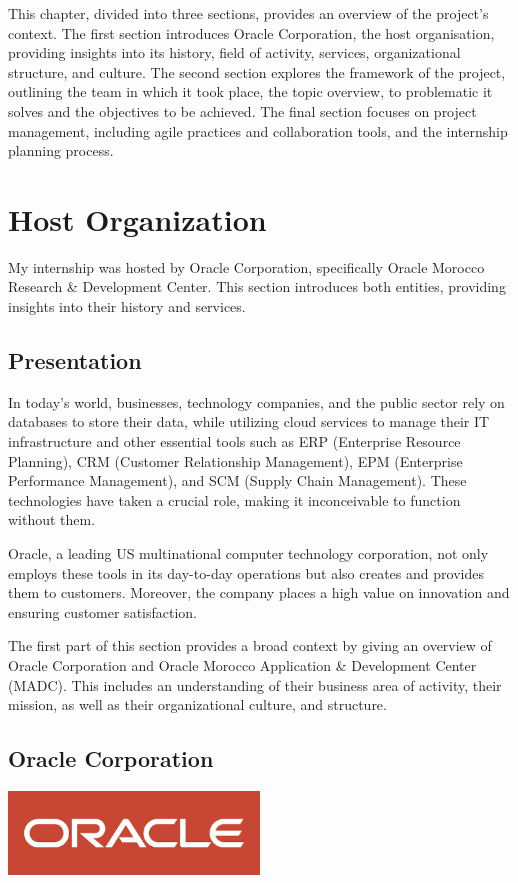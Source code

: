 This chapter, divided into three sections, provides an overview of the project’s context. The first section introduces Oracle Corporation, the host organisation, providing insights into its history, field of activity, services, organizational structure, and culture. The second section explores the framework of the project, outlining the team in which it took place, the topic overview, to problematic it solves and the objectives to be achieved. The final section focuses on project management, including agile practices and collaboration tools, and the internship planning process.
\newpage
{}

\section{Host Organization}

My internship was hosted by Oracle Corporation, specifically Oracle Morocco Research \& Development Center. This section introduces both entities, providing insights into their history and services.

\subsection{Presentation}
In today's world, businesses, technology companies, and the public sector rely on databases to store their data, while utilizing cloud services to manage their IT infrastructure and other essential tools such as ERP (Enterprise Resource Planning), CRM (Customer Relationship Management), EPM (Enterprise Performance Management), and SCM (Supply Chain Management). These technologies have taken a crucial role, making it inconceivable to function without them.\mynewline

Oracle, a leading US multinational computer technology corporation, not only employs these tools in its day-to-day operations but also creates and provides them to customers. Moreover, the company places a high value on innovation and ensuring customer satisfaction.\mynewline

The first part of this section provides a broad context by giving an overview of Oracle Corporation and Oracle Morocco Application \& Development Center (MADC). This includes an understanding of their business area of activity, their mission, as well as their organizational culture, and structure.

\subsection{Oracle Corporation}
\begin{center}
    \centering
    \includegraphics[width=0.5\textwidth]{Images/oracle_corp_logo.jpg}
     \cite{O-History}
    \label{fig:oracle}
\end{center}

